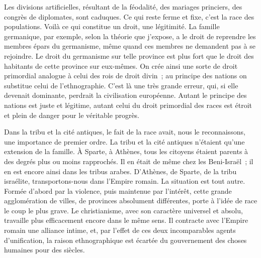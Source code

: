 \documentclass[twoside]{book} %
\newcommand\orgName[1]{#1}
\newcommand\placeName[1]{#1}
\begin{document}
\noindent Les divisions artificielles, résultant de la féodalité, des mariages princiers, des congrès de diplomates, sont caduques. Ce qui reste ferme et fixe, c’est la race des populations. Voilà ce qui constitue un droit, une légitimité. La famille germanique, par exemple, selon la théorie que j’expose, a le droit de reprendre les membres épars du germanisme, même quand ces membres ne demandent pas à se rejoindre. Le droit du germanisme sur telle province est plus fort que le droit des habitants de cette province sur eux-mêmes. On crée ainsi une sorte de droit primordial analogue à celui des rois de droit divin ; au principe des nations on substitue celui de l’ethnographie. C’est là une très grande erreur, qui, si elle devenait dominante, perdrait la civilisation européenne. Autant le principe des nations est juste et légitime, autant celui du droit primordial des races est étroit et plein de danger pour le véritable progrès.\par
Dans la tribu et la cité antiques, le fait de la race avait, nous le reconnaissons, une importance de premier ordre. La tribu et la cité antiques n’étaient qu’une extension de la famille. À {\placeName Sparte}, à {\placeName Athènes}, tous les citoyens étaient parents à des degrés plus ou moins rapprochés. Il en était de même chez les {\orgName Beni-Israël} ; il en est encore ainsi dans les {\orgName tribus arabes}. D’{\placeName Athènes}, de {\placeName Sparte}, de la {\orgName tribu israélite}, transportons-nous dans l’{\orgName Empire romain}. La situation est tout autre. Formée d’abord par la violence, puis maintenue par l’intérêt, cette grande agglomération de villes, de provinces absolument différentes, porte à l’idée de race le coup le plus grave. Le christianisme, avec son caractère universel et absolu, travaille plus efficacement encore dans le même sens. Il contracte avec l’{\orgName Empire romain} une alliance intime, et, par l’effet de ces deux incomparables agents d’unification, la raison ethnographique est écartée du gouvernement des choses humaines pour des siècles.\par
\end{document}
